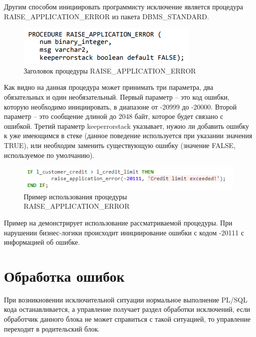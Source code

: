 Другим способом инициировать программисту исключение является процедура RAISE\_APPLICATION\_ERROR из пакета DBMS\_STANDARD.

\begin{figure}[ht!] 
	\center
	\includegraphics [scale=1] {my_folder/img/C1_raise_application_error_signature}
	\caption{Заголовок процедуры RAISE\_APPLICATION\_ERROR} 
	\label{fig:C1_raise_application_error_signature}  
\end{figure}
\FloatBarrier

Как видно на  данная процедура может принимать три параметра, два обязательных и один необязательный. Первый параметр – это код ошибки, которую необходимо инициировать, в диапазоне от -20999 до -20000. Второй параметр – это сообщение длиной до 2048 байт, которое будет связано с ошибкой. Третий параметр keeperrorstack указывает, нужно ли добавить ошибку к уже имеющимся в стеке (данное поведение используется при указании значения TRUE), или необходим заменить существующую ошибку (значение FALSE, используемое по умолчанию).

\begin{figure}[ht!] 
	\center
	\includegraphics [scale=1] {my_folder/img/C1_raise_application_error_example}
	\caption{Пример использования процедуры RAISE\_APPLICATION\_ERROR} 
	\label{fig:C1_raise_application_error_example}  
\end{figure}
\FloatBarrier

Пример на  демонстрирует использование рассматриваемой процедуры. При нарушении бизнес-логики происходит инициирование ошибки с кодом -20111 с информацией об ошибке. 

\section{Обработка ошибок}\label{ch1:sec4}

При возникновении исключительной ситуации нормальное выполнение PL/SQL кода останавливается, а управление получает раздел обработки исключений, если обработчик данного блока не может справиться с такой ситуацией, то управление переходит в родительский блок. 

